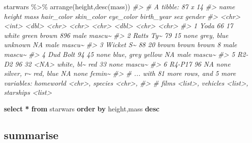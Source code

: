 \documentclass[
]{book}
\newenvironment{Shaded}{\begin{snugshade}}{\end{snugshade}}
\newcommand{\CommentTok}[1]{\textcolor[rgb]{0.56,0.35,0.01}{\textit{#1}}}
\newcommand{\FunctionTok}[1]{\textcolor[rgb]{0.00,0.00,0.00}{#1}}
\newcommand{\KeywordTok}[1]{\textcolor[rgb]{0.13,0.29,0.53}{\textbf{#1}}}
\newcommand{\NormalTok}[1]{#1}
\newcommand{\OperatorTok}[1]{\textcolor[rgb]{0.81,0.36,0.00}{\textbf{#1}}}
\newcommand{\SpecialCharTok}[1]{\textcolor[rgb]{0.00,0.00,0.00}{#1}}
\begin{document}
\begin{Shaded}
\begin{Highlighting}[]
\NormalTok{starwars }\SpecialCharTok{\%\textgreater{}\%} 
  \FunctionTok{arrange}\NormalTok{(height,}\FunctionTok{desc}\NormalTok{(mass))}
\CommentTok{\#\textgreater{} \# A tibble: 87 x 14}
\CommentTok{\#\textgreater{}   name      height  mass hair\_color skin\_color eye\_color birth\_year sex   gender}
\CommentTok{\#\textgreater{}   \textless{}chr\textgreater{}      \textless{}int\textgreater{} \textless{}dbl\textgreater{} \textless{}chr\textgreater{}      \textless{}chr\textgreater{}      \textless{}chr\textgreater{}          \textless{}dbl\textgreater{} \textless{}chr\textgreater{} \textless{}chr\textgreater{} }
\CommentTok{\#\textgreater{} 1 Yoda          66    17 white      green      brown            896 male  mascu\textasciitilde{}}
\CommentTok{\#\textgreater{} 2 Ratts Ty\textasciitilde{}     79    15 none       grey, blue unknown           NA male  mascu\textasciitilde{}}
\CommentTok{\#\textgreater{} 3 Wicket S\textasciitilde{}     88    20 brown      brown      brown              8 male  mascu\textasciitilde{}}
\CommentTok{\#\textgreater{} 4 Dud Bolt      94    45 none       blue, grey yellow            NA male  mascu\textasciitilde{}}
\CommentTok{\#\textgreater{} 5 R2{-}D2         96    32 \textless{}NA\textgreater{}       white, bl\textasciitilde{} red               33 none  mascu\textasciitilde{}}
\CommentTok{\#\textgreater{} 6 R4{-}P17        96    NA none       silver, r\textasciitilde{} red, blue         NA none  femin\textasciitilde{}}
\CommentTok{\#\textgreater{} \# ... with 81 more rows, and 5 more variables: homeworld \textless{}chr\textgreater{}, species \textless{}chr\textgreater{},}
\CommentTok{\#\textgreater{} \#   films \textless{}list\textgreater{}, vehicles \textless{}list\textgreater{}, starships \textless{}list\textgreater{}}
\end{Highlighting}
\end{Shaded}

\begin{Shaded}
\begin{Highlighting}[]
\KeywordTok{select} \OperatorTok{*} \KeywordTok{from}\NormalTok{ starwars }\KeywordTok{order} \KeywordTok{by}\NormalTok{ height,mass }\KeywordTok{desc}
\end{Highlighting}
\end{Shaded}

\hypertarget{dplyr-summarise}{%
\subsection{summarise}\label{dplyr-summarise}}
\end{document}
